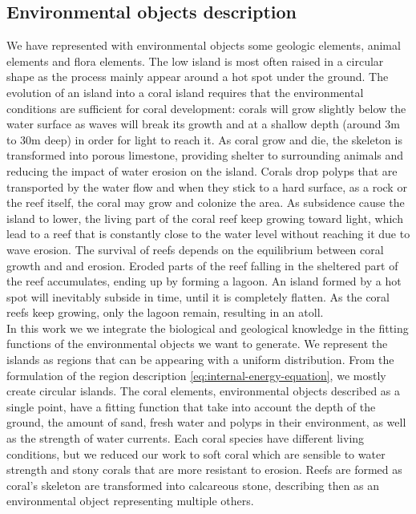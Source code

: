 \subsection{Environmental objects description}
\label{EnvironmentObjects-sec:represented-objects}
We have represented with environmental objects some geologic elements, animal elements and flora elements. The low island is most often raised in a circular shape as the process mainly appear around a hot spot under the ground. The evolution of an island into a coral island requires that the environmental conditions are sufficient for coral development: corals will grow slightly below the water surface as waves will break its growth and at a shallow depth (around 3m to 30m deep) in order for light to reach it. As coral grow and die, the skeleton is transformed into porous limestone, providing shelter to surrounding animals and reducing the impact of water erosion on the island. Corals drop polyps that are transported by the water flow and when they stick to a hard surface, as a rock or the reef itself, the coral may grow and colonize the area. As subsidence cause the island to lower, the living part of the coral reef keep growing toward light, which lead to a reef that is constantly close to the water level without reaching it due to wave erosion. The survival of reefs depends on the equilibrium between coral growth and and erosion. Eroded parts of the reef falling in the sheltered part of the reef accumulates, ending up by forming a lagoon. An island formed by a hot spot will inevitably subside in time, until it is completely flatten. As the coral reefs keep growing, only the lagoon remain, resulting in an atoll. \\
In this work we we integrate the biological and geological knowledge in the fitting functions of the environmental objects we want to generate. We represent the islands as regions that can be appearing with a uniform distribution. From the formulation of the region description \eqref{eq:internal-energy-equation}, we mostly create circular islands. The coral elements, environmental objects described as a single point, have a fitting function that take into account the depth of the ground, the amount of sand, fresh water and polyps in their environment, as well as the strength of water currents. Each coral species have different living conditions, but we reduced our work to soft coral which are sensible to water strength and stony corals that are more resistant to erosion. Reefs are formed as coral's skeleton are transformed into calcareous stone, describing then as an environmental object representing multiple others. 

